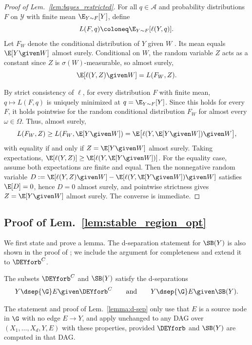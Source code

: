 \begin{proof}[Proof of Lem.~\ref{lem:bayes_restricted}]
For all $q \in \mathcal{A}$ and probability distributions $F$ on $\mathcal{Y}$ with finite mean $\E_{Y \sim F}[Y]$, define
$$
L(F, q) \coloneq \E_{Y \sim F}[\ell(Y, q)].
$$
Let $F_W$ denote the conditional distribution of $Y$ given $W$ \citep[Thm.~8.5]{kallenbergFoundationsModernProbability2021}. Its mean equals $\E[Y \given W]$ almost surely. Conditional on $W$, the random variable $Z$ acts as a constant since $Z$ is $\sigma(W)$-measurable, so almost surely, 
$$
\E[\ell(Y, Z) \given W] = L(F_W, Z).
$$

By strict consistency of $\ell$, for every distribution $F$ with finite mean,
$q \mapsto L(F, q)$ is uniquely minimized at $q = \E_{Y \sim F}[Y]$.
Since this holds for every $F$, it holds pointwise for the random
conditional distribution $F_W$ for almost every $\omega \in \Omega$.
Thus, almost surely, 
$$
  L(F_W, Z) \geq L(F_W, \E[Y \given W])
  =
  \E\big[\ell(Y, \E[Y \given W]) \given W\big],
$$
with equality if and only if $Z = \E[Y \given W]$ almost surely. Taking
expectations, $\E[\ell(Y,Z)] \geq \E[\ell(Y,\E[Y \given W])]$. For the equality
case, assume both expectations are finite and equal. Then the
nonnegative random variable
$D := \E[\ell(Y,Z)\given W] - \E[\ell(Y,\E[Y \given W])\given W]$ satisfies
$\E[D] = 0$, hence $D = 0$ almost surely, and pointwise strictness
gives $Z = \E[Y \given W]$ almost surely. The converse is immediate.
\end{proof}

\subsection{Proof of Lem.~\ref{lem:stable_region_opt}}
We first state and prove a lemma. The d-separation statement
for $\SB(Y)$ is also shown in the proof of
\citet[Thm.~3.5]{pfisterStabilizingVariableSelection2021}; we include
the argument for completeness and extend it to $\DEYforb^C$.

\begin{lemma}\label{lemma:d-sep}
The subsets $\DEYforb^C$ and $\SB(Y)$ satisfy the d-separations
$$
  Y \dsep{\G} E \given \DEYforb^C
  \qquad\text{and}\qquad
  Y \dsep{\G} E \given \SB(Y).
$$
\end{lemma}
\begin{remark} \label{rem:SB_in_different_DAGs}
    The statement and proof of Lem.~\ref{lemma:d-sep} only use that $E$ is a source node in $\G$ with no edge $E \to Y$, and apply unchanged to any DAG over $(X_1, \ldots, X_d, Y, E)$ with these properties, provided $\DEYforb$ and $\SB(Y)$ are computed in that DAG.
\end{remark}


